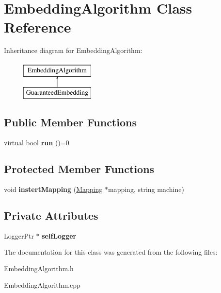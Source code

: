 \hypertarget{classEmbeddingAlgorithm}{\section{\-Embedding\-Algorithm \-Class \-Reference}
\label{classEmbeddingAlgorithm}
}
\-Inheritance diagram for \-Embedding\-Algorithm\-:\begin{figure}[H]
\begin{center}
\leavevmode
\includegraphics[height=2.000000cm]{classEmbeddingAlgorithm}
\end{center}
\end{figure}
\subsection*{\-Public \-Member \-Functions}
\begin{DoxyCompactItemize}
\item 
\hypertarget{classEmbeddingAlgorithm_ab06f5949aea8dd9b9126980e07d5e17b}{virtual bool {\bfseries run} ()=0}\label{classEmbeddingAlgorithm_ab06f5949aea8dd9b9126980e07d5e17b}

\end{DoxyCompactItemize}
\subsection*{\-Protected \-Member \-Functions}
\begin{DoxyCompactItemize}
\item 
\hypertarget{classEmbeddingAlgorithm_a019d6662e360610fa3ff6e5a35af6da2}{void {\bfseries instert\-Mapping} (\hyperlink{classMapping}{\-Mapping} $\ast$mapping, string machine)}\label{classEmbeddingAlgorithm_a019d6662e360610fa3ff6e5a35af6da2}

\end{DoxyCompactItemize}
\subsection*{\-Private \-Attributes}
\begin{DoxyCompactItemize}
\item 
\hypertarget{classEmbeddingAlgorithm_a4fa0f797fd89d4c98a8b57fb9c2a2dd3}{\-Logger\-Ptr $\ast$ {\bfseries self\-Logger}}\label{classEmbeddingAlgorithm_a4fa0f797fd89d4c98a8b57fb9c2a2dd3}

\end{DoxyCompactItemize}


\-The documentation for this class was generated from the following files\-:\begin{DoxyCompactItemize}
\item 
\-Embedding\-Algorithm.\-h\item 
\-Embedding\-Algorithm.\-cpp\end{DoxyCompactItemize}
